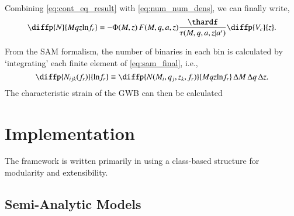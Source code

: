         Combining \eqref{eq:cont_eq_result} with \eqref{eq:num_num_dens}, we can finally write,
        \begin{equation}
            \label{eq:sam_final}
            \diffp{N}{{M}{q}{z}{\ln\!f_r}} = - \Phi(M,z) \, F(M,q,a,z) \frac{\thardf}{\tau(M,q,a,z|a')} \diffp{V_c}{z}.
        \end{equation}

        From the SAM formalism, the number of binaries in each bin is calculated by `integrating' each finite element of \eqref{eq:sam_final}, i.e.,
        \begin{equation}
            \diffp{N_{ijk}(f_r)}{{\ln\!f_r}} \equiv \diffp{N(M_i, q_j, z_k, {f_r})}{{M}{q}{z}{\ln\!f_r}} \, \Delta M \,\Delta q \, \Delta z.
        \end{equation}
        The characteristic strain of the GWB can then be calculated




\section{Implementation}
    \label{sec:imp}

    The \holodeck{} framework is written primarily in \python{} using a class-based structure for modularity and extensibility.

    \subsection{Semi-Analytic Models}
        \label{sec:imp_sam}

